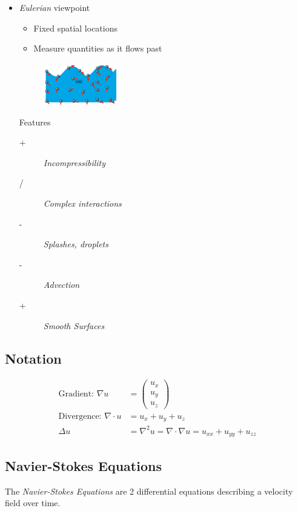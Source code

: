 \begin{multicols}{2}
\begin{itemize}
\begin{itemize}
\begin{description}
			\end{description}
		\end{itemize}
	\item \emph{Eulerian} viewpoint
		\begin{itemize}
			\item Fixed spatial locations
			\item Measure quantities as it flows past
		\end{itemize}
		\begin{figure}[H]
				\centering
				\includegraphics[width=0.3\textwidth,page=2]{img/05_spatial_discretization}
			\end{figure}
			Features
			\begin{description}
				\item[+] \emph{Incompressibility}
				\item[/] \emph{Complex interactions}
				\item[-] \emph{Splashes, droplets}
				\item[-] \emph{Advection}
				\item[+] \emph{Smooth Surfaces}
			
			\end{description}
\end{itemize}
\subsection{Notation}
	\begin{align*}
		\text{Gradient: }\nabla u &= \begin{pmatrix}
 										u_x \\ u_y \\ u_z
 									  \end{pmatrix}\\
		\text{Divergence: }\nabla \cdot u &= u_x + u_y + u_z\\
		\Delta u &= \nabla^2 u = \nabla \cdot \nabla u = u_{xx} + u_{yy} + u_{zz}
	\end{align*}


\subsection{Navier-Stokes Equations}
The \emph{Navier-Stokes Equations} are 2 differential equations describing a velocity field over time.\\


\end{multicols}

